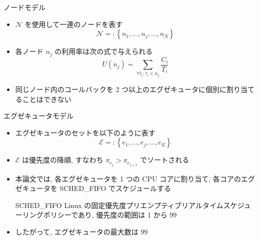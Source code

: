 \begin{frame}{ノードモデル}
    \begin{itemize}
        \item  $\mathcal{N}$ を使用して一連のノードを表す
              \vspace{-2mm}
              \begin{equation*}
                  \mathcal{N}=:\left\{n_{1}, \ldots, n_{j}, \ldots, n_{N}\right\}
              \end{equation*}
        \item 各ノード $n_{j}$ の利用率は次の式で与えられる
              \vspace{-2mm}
              \begin{equation*}
                  U\left(n_{j}\right)=\sum_{\forall t_{i}: \tau_{i} \in n_{j}} \frac{C_{i}}{T_{i}}
              \end{equation*}
        \item 同じノード内のコールバックを 2 つ以上のエグゼキュータに個別に割り当てることはできない
    \end{itemize}
\end{frame}

\begin{frame}{エグゼキュータモデル}
    \begin{itemize}
        \item エグゼキュータのセットを以下のように表す
              \vspace{-2mm}
              \begin{equation*}
                  \mathcal{E}=:\left\{e_{1}, \ldots, e_{j}, \ldots, e_{E}\right\}
              \end{equation*}

        \item $\mathcal{E}$ は優先度の降順, すなわち $\pi_{e_{j}}>\pi_{e_{j+1}}$ でソートされる
        \item 本論文では, 各エグゼキュータを 1 つの CPU コアに割り当て, 各コアのエグゼキュータを SCHED\_FIFO でスケジュールする
              \begin{block}{SCHED\_FIFO}
                  Linux の固定優先度プリエンプティブリアルタイムスケジューリングポリシーであり, 優先度の範囲は 1 から 99
              \end{block}
              \vspace{5mm}
        \item したがって, エグゼキュータの最大数は 99
    \end{itemize}
\end{frame}

